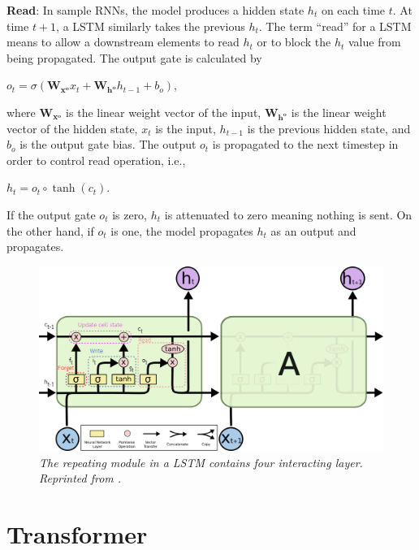 \textbf{Read}: In sample RNNs, the model produces a hidden state $h_t$ on each time $t$. At  time $t+1$, a LSTM similarly takes the previous $h_t$. The term “read” for a LSTM means to allow a downstream elements to read $h_t$ or to block the $h_t$ value from being propagated. The output gate is calculated by

\hfil $ o_t = \sigma(\mathbf{W_{x^o}}x_t + \mathbf{W_{h^o}}h_{t-1} + b_o) $, \par

where $\mathbf{W_{x^o}}$ is the linear weight vector of the input, $\mathbf{W_{h^o}}$ is the linear weight vector of the hidden state, $x_t$ is the input, $h_{t-1}$ is the previous hidden state, and $b_o$ is the output gate bias. The output $o_t$ is propagated to the next timestep in order to control read operation, i.e.,

\hfil $ h_t = o_t \circ \tanh(c_t) $. \par
If the output gate $o_t$ is zero, $h_t$ is attenuated to zero meaning nothing is sent. On the other hand, if $o_t$ is one, the model propagates $h_t$ as an output and propagates.

\begin{figure}[H]
  \centering
  \caption[The repeating module in a LSTM contains four interacting layer.]{\emph{The repeating module in a LSTM contains four interacting layer. \\Reprinted from \citeauthor{olah_2015} \citeyear{olah_2015}.}}\label{fig:LSTM_2}
  \includegraphics[scale = 0.14]{figures/LSTM_2.jpg}

\end{figure}

\section{Transformer}

